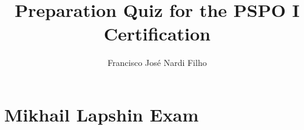 \documentclass[a4paper,11pt]{article}
\begin{document}
\title{\bf{Preparation Quiz for the PSPO I Certification}}
\author{Francisco Jos\'e Nardi Filho}
\date{}
\maketitle


\section{Mikhail Lapshin Exam}

%
\end{document}
